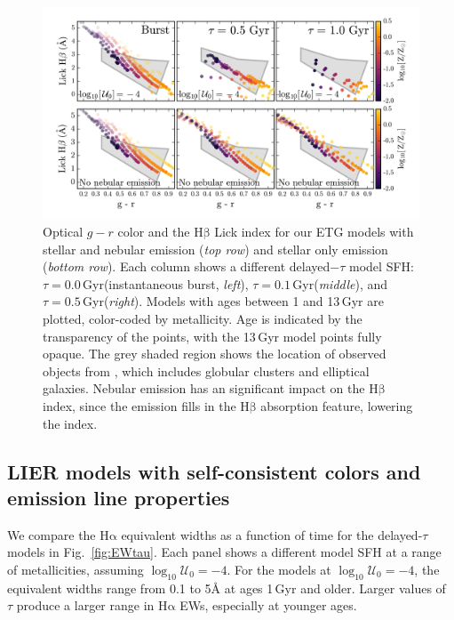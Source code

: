 \documentclass[preprint2]{aastex62}
\newcommand{\ha}{\ensuremath{\mathrm{H\alpha}}\xspace}
\newcommand{\hb}{\ensuremath{\mathrm{H\beta}}\xspace}
\newcommand{\logten}{\ensuremath{\log_{10}}}
\newcommand{\ang}{\ensuremath{\mbox{\AA}}\xspace}
\newcommand{\logUeq}[1]{\ensuremath{\logten \mathcal{U}_0 = #1}}
\newcommand{\Gyr}{$\,$Gyr\xspace}
\begin{document}
\begin{figure}
  \begin{center}
    \includegraphics[width=\linewidth]{figs/f11.png}
    \caption{Optical $g-r$ color and the \hb Lick index for our ETG models with stellar and nebular emission (\emph{top row}) and stellar only emission (\emph{bottom row}). Each column shows a different delayed$-\tau$ model SFH: $\tau=0.0$\Gyr (instantaneous burst, \emph{left}), $\tau=0.1$\Gyr (\emph{middle}), and $\tau=0.5$\Gyr (\emph{right}). Models with ages between 1 and 13\Gyr are plotted, color-coded by metallicity. Age is indicated by the transparency of the points, with the 13\Gyr model points fully opaque. The grey shaded region shows the location of observed objects from \citet{Schombert+2016}, which includes globular clusters and elliptical galaxies. Nebular emission has an significant impact on the \hb index, since the emission fills in the \hb absorption feature, lowering the index.
    }
    \label{fig:LickHb}
  \end{center}
\end{figure}

\subsection{LIER models with self-consistent colors and emission line properties} \label{sec:stars:EW:sfh}

We compare the \ha equivalent widths as a function of time for the delayed-$\tau$ models in Fig.~\ref{fig:EWtau}. Each panel shows a different model SFH at a range of metallicities, assuming \logUeq{-4}. For the models at \logUeq{-4}, the equivalent widths range from 0.1 to 5\ang at ages 1\Gyr and older. Larger values of $\tau$ produce a larger range in \ha EWs, especially at younger ages.
\end{document}
